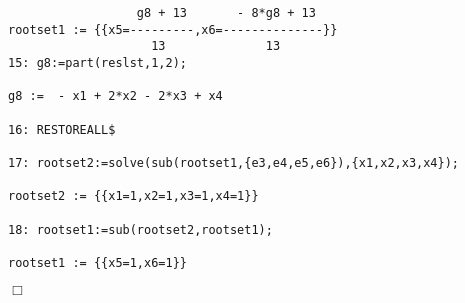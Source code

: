 {\begin{verbatim}
                  g8 + 13       - 8*g8 + 13
rootset1 := {{x5=---------,x6=--------------}}
                    13              13
15: g8:=part(reslst,1,2);

g8 :=  - x1 + 2*x2 - 2*x3 + x4

16: RESTOREALL$

17: rootset2:=solve(sub(rootset1,{e3,e4,e5,e6}),{x1,x2,x3,x4});

rootset2 := {{x1=1,x2=1,x3=1,x4=1}}

18: rootset1:=sub(rootset2,rootset1);

rootset1 := {{x5=1,x6=1}}
\end{verbatim}
\begin{flushright}
$\Box$
\end{flushright}}
\example\label{ex:3.2.7}

